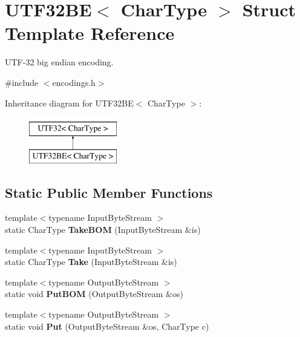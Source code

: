 \hypertarget{structUTF32BE}{}\section{U\+T\+F32\+BE$<$ Char\+Type $>$ Struct Template Reference}
\label{structUTF32BE}


U\+T\+F-\/32 big endian encoding.  




{\ttfamily \#include $<$encodings.\+h$>$}

Inheritance diagram for U\+T\+F32\+BE$<$ Char\+Type $>$\+:\begin{figure}[H]
\begin{center}
\leavevmode
\includegraphics[height=2.000000cm]{structUTF32BE}
\end{center}
\end{figure}
\subsection*{Static Public Member Functions}
\begin{DoxyCompactItemize}
\item 
{\footnotesize template$<$typename Input\+Byte\+Stream $>$ }\\static Char\+Type {\bfseries Take\+B\+OM} (Input\+Byte\+Stream \&is)\hypertarget{structUTF32BE_a07d228f51ad43ef83af2529ca4bd1181}{}\label{structUTF32BE_a07d228f51ad43ef83af2529ca4bd1181}

\item 
{\footnotesize template$<$typename Input\+Byte\+Stream $>$ }\\static Char\+Type {\bfseries Take} (Input\+Byte\+Stream \&is)\hypertarget{structUTF32BE_ace3086ece3b13417c758b5abcf3016c8}{}\label{structUTF32BE_ace3086ece3b13417c758b5abcf3016c8}

\item 
{\footnotesize template$<$typename Output\+Byte\+Stream $>$ }\\static void {\bfseries Put\+B\+OM} (Output\+Byte\+Stream \&os)\hypertarget{structUTF32BE_a8b1a216dd267ff06a9000cbe593ebd24}{}\label{structUTF32BE_a8b1a216dd267ff06a9000cbe593ebd24}

\item 
{\footnotesize template$<$typename Output\+Byte\+Stream $>$ }\\static void {\bfseries Put} (Output\+Byte\+Stream \&os, Char\+Type c)\hypertarget{structUTF32BE_ad270b8b016d477f7f7354df535fa28c5}{}\label{structUTF32BE_ad270b8b016d477f7f7354df535fa28c5}

\end{DoxyCompactItemize}

